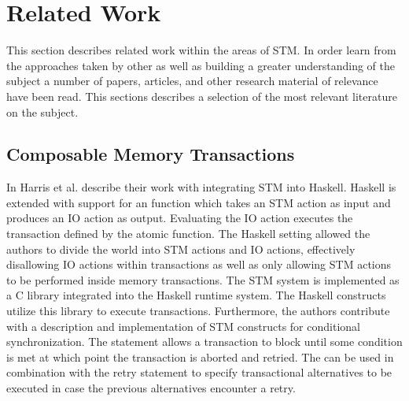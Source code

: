 \section{Related Work}
This section describes related work within the areas of \ac{STM}. In order learn from the approaches taken by other as well as building a greater understanding of the subject a number of papers, articles, and other research material of relevance have been read. This sections describes a selection of the most relevant literature on the subject.

\subsection{Composable Memory Transactions}
In \cite{harris2005composable} Harris et al. describe their work with integrating \ac{STM} into Haskell. Haskell is extended with support for an  function which takes an \ac{STM} action as input and produces an \ac{IO} action as output\cite[p. 51]{harris2005composable}. Evaluating the IO action executes the transaction defined by the atomic function. The Haskell setting allowed the authors to divide the world into \ac{STM} actions and \ac{IO} actions\cite[p. 51]{harris2005composable}, effectively disallowing \ac{IO} actions within transactions as well as only allowing \ac{STM} actions to be performed inside memory transactions. The \ac{STM} system is implemented as a C library integrated into the Haskell runtime system. The Haskell constructs utilize this library to execute transactions\cite[p. 56]{harris2005composable}. Furthermore, the authors contribute with a description and implementation of \ac{STM} constructs for conditional synchronization. The  statement allows a transaction to block until some condition is met at which point the transaction is aborted and retried\cite[p. 52]{harris2005composable}. The  can be used in combination with the retry statement to specify transactional alternatives to be executed in case the previous alternatives encounter a retry\cite[p. 52]{harris2005composable}.

